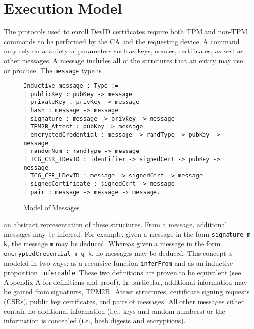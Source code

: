 
\chapter{Execution Model}

The protocols used to enroll DevID certificates require both TPM and non-TPM commands to be performed by the CA and the requesting device. A command may rely on a variety of parameters such as keys, nonces, certificates, as well as other messages. A message includes all of the structures that an entity may use or produce. The \verb|message| type is 
\begin{figure}[h]
\begin{lstlisting}[language=Coq]
Inductive message : Type :=
| publicKey : pubKey -> message
| privateKey : privKey -> message
| hash : message -> message
| signature : message -> privKey -> message
| TPM2B_Attest : pubKey -> message
| encryptedCredential : message -> randType -> pubKey -> message
| randomNum : randType -> message
| TCG_CSR_IDevID : identifier -> signedCert -> pubKey -> message
| TCG_CSR_LDevID : message -> signedCert -> message
| signedCertificate : signedCert -> message
| pair : message -> message -> message.
\end{lstlisting}
\caption{Model of Messages}
\end{figure}
an abstract representation of these structures. From a message, additional messages may be inferred. For example, given a message in the form \verb|signature m k|, the message \verb|m| may be deduced. Whereas given a message in the form \verb|encryptedCredential n g k|, no messages may be deduced. This concept is modeled in two ways: as a recursive function \verb|inferFrom| and as an inductive proposition \verb|inferrable|. These two definitions are proven to be equivalent (see Appendix A for definitions and proof). In particular, additional information may be gained from signatures, TPM2B\_Attest structures, certificate signing requests (CSRs), public key certificates, and pairs of messages. All other messages either contain no additional information (i.e., keys and random numbers) or the information is concealed (i.e., hash digests and encryptions).



